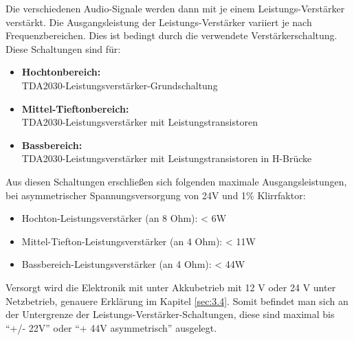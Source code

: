 Die verschiedenen Audio-Signale werden dann mit je einem Leistungs-Verstärker verstärkt.
Die Ausgangsleistung der Leistungs-Verstärker variiert je nach Frequenzbereichen.
Dies ist bedingt durch die verwendete Verstärkerschaltung.\\
Diese Schaltungen sind für:
\begin{itemize}
	\item \textbf{Hochtonbereich:}\\ TDA2030-Leistungsverstärker-Grundschaltung
	\item \textbf{Mittel-Tieftonbereich:}\\ TDA2030-Leistungsverstärker mit Leistungstransistoren
	\item \textbf{Bassbereich:}\\ TDA2030-Leistungsverstärker mit Leistungstransistoren in H-Brücke
\end{itemize}
Aus diesen Schaltungen erschließen sich folgenden maximale Ausgangsleistungen, bei asymmetrischer Spannungsversorgung von 24V und 1\% Klirrfaktor:\\
\begin{itemize}
	\item Hochton-Leistungsverstärker (an 8 Ohm): < 6W
	\item Mittel-Tiefton-Leistungsverstärker (an 4 Ohm): < 11W
	\item Bassbereich-Leistungsverstärker (an 4 Ohm): < 44W
\end{itemize}

Versorgt wird die Elektronik mit unter Akkubetrieb mit 12 V oder 24 V unter Netzbetrieb, genauere Erklärung im Kapitel \ref{sec:3.4}.
Somit befindet man sich an der Untergrenze der Leistungs-Verstärker-Schaltungen, diese sind maximal bis \enquote{+/- 22V} oder \enquote{+ 44V asymmetrisch} ausgelegt.

\newpage
